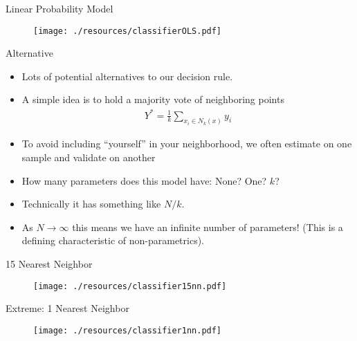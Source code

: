 \begin{frame}{Linear Probability Model}
\begin{figure}[htbp]
\begin{center}
\texttt{[image: ./resources/classifierOLS.pdf]}
\label{classOLS}
\end{center}
\end{figure}
\end{frame}


\begin{frame}{Alternative}
\begin{itemize}
\item Lots of potential alternatives to our decision rule.
\item A simple idea is to hold a majority vote of neighboring points 
\begin{eqnarray*}
Y^{*} = \frac{1}{k} \sum_{x_i \in N_k(x)} y_i
\end{eqnarray*}
\item To avoid including ``yourself'' in your neighborhood, we often estimate on one sample and validate on another
\item How many parameters does this model have: None? One? $k$? 
\item Technically it has something like $N/k$.
\item As $N \rightarrow \infty$ this means we have an infinite number of parameters! (This is a defining characteristic of non-parametrics).
\end{itemize}
\end{frame}


\begin{frame}{15 Nearest Neighbor}
\begin{figure}[htbp]
\begin{center}
\texttt{[image: ./resources/classifier15nn.pdf]}
\label{class15nn}
\end{center}
\end{figure}
\end{frame}

\begin{frame}{Extreme: 1 Nearest Neighbor}
\begin{figure}[htbp]
\begin{center}
\texttt{[image: ./resources/classifier1nn.pdf]}
\label{class15nn}
\end{center}
\end{figure}
\end{frame}

